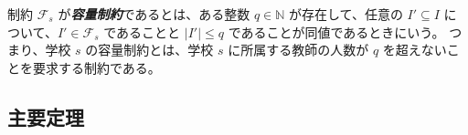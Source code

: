 \documentclass[12pt, a4paper]{article}
\theoremstyle{definition}
\theoremstyle{remark}
\theoremstyle{plain}
\newtheorem{theorem}{定理}
\begin{document}




制約 $\mathcal{F}_s$ が\textbf{\textit{容量制約}}であるとは、ある整数 $q \in \mathbb{N}$ が存在して、任意の $I' \subseteq I$ について、$I' \in \mathcal{F}_s$ であることと $|I'| \le q$ であることが同値であるときにいう。
つまり、学校 $s$ の容量制約とは、学校 $s$ に所属する教師の人数が $q$ を超えないことを要求する制約である。

\subsection{主要定理}






\end{document}
